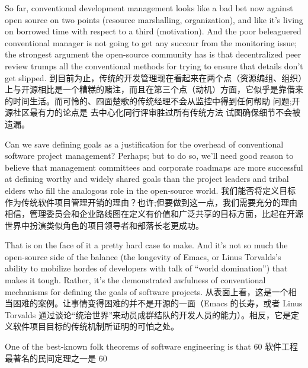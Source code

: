 \documentclass[a4paper,12pt,UTF8,twoside]{ctexbook}
\begin{document}
So far, conventional development management looks like a bad bet now against open source on two points (resource marshalling, organization), and like it's living on borrowed time with respect to a third (motivation). And the poor beleaguered conventional manager is not going to get any succour from the monitoring issue; the strongest argument the open-source community has is that decentralized peer review trumps all the conventional methods for trying to ensure that details don't get slipped.
到目前为止，传统的开发管理现在看起来在两个点（资源编组、组织）上与开源相比是一个糟糕的赌注，而且在第三个点（动机）方面，它似乎是靠借来的时间生活。而可怜的、四面楚歌的传统经理不会从监控中得到任何帮助 问题;开源社区最有力的论点是 去中心化同行评审胜过所有传统方法 试图确保细节不会被遗漏。

Can we save defining goals as a justification for the overhead of conventional software project management? Perhaps; but to do so, we'll need good reason to believe that management committees and corporate roadmaps are more successful at defining worthy and widely shared goals than the project leaders and tribal elders who fill the analogous role in the open-source world.
我们能否将定义目标作为传统软件项目管理开销的理由？也许;但要做到这一点，我们需要充分的理由相信，管理委员会和企业路线图在定义有价值和广泛共享的目标方面，比起在开源世界中扮演类似角色的项目领导者和部落长老更成功。

That is on the face of it a pretty hard case to make. And it's not so much the open-source side of the balance (the longevity of Emacs, or Linus Torvalds's ability to mobilize hordes of developers with talk of ``world domination'') that makes it tough. Rather, it's the demonstrated awfulness of conventional mechanisms for defining the goals of software projects.
从表面上看，这是一个相当困难的案例。让事情变得困难的并不是开源的一面（Emacs 的长寿，或者 Linus Torvalds 通过谈论“统治世界”来动员成群结队的开发人员的能力）。相反，它是定义软件项目目标的传统机制所证明的可怕之处。

One of the best-known folk theorems of software engineering is that 60%
软件工程最著名的民间定理之一是 60%
\end{document}
